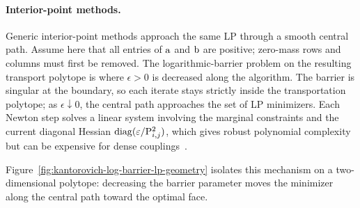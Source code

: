 \paragraph{Interior-point methods.}\label{par-transport-interior-point}

Generic interior-point methods approach the same LP through a smooth central path. Assume here that all entries of $\mathrm{a}$ and $\mathrm{b}$ are positive; zero-mass rows and columns must first be removed. The logarithmic-barrier problem on the resulting transport polytope is
where $\epsilon>0$ is decreased along the algorithm. The barrier is singular at the boundary, so each iterate stays strictly inside the transportation polytope; as $\epsilon\downarrow0$, the central path approaches the set of LP minimizers. Each Newton step solves a linear system involving the marginal constraints and the current diagonal Hessian $\operatorname{diag}(\varepsilon/\mathrm{P}_{i,j}^2)$, which gives robust polynomial complexity but can be expensive for dense couplings~\cite{nesterov1994interior}.

Figure~\ref{fig:kantorovich-log-barrier-lp-geometry} isolates this mechanism on a two-dimensional polytope: decreasing the barrier parameter moves the minimizer along the central path toward the optimal face.

